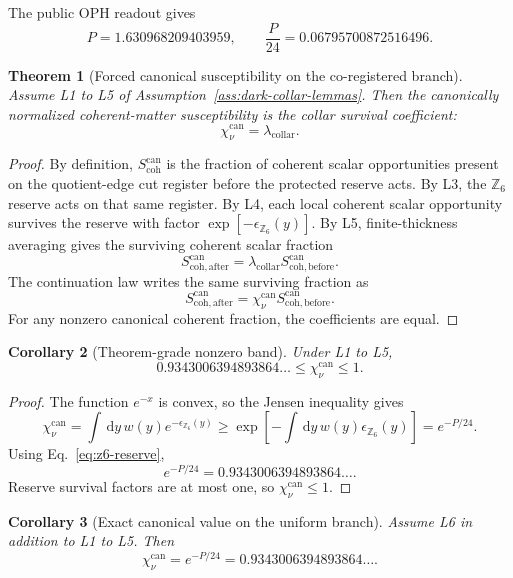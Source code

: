 \documentclass[11pt]{article}
\numberwithin{equation}{section}
\newtheorem{theorem}{Theorem}[section]
\newtheorem{corollary}[theorem]{Corollary}
\theoremstyle{remark}
\newcommand{\chican}{\chi_\nu^{\mathrm{can}}}
\newcommand{\scohcan}{S_{\mathrm{coh}}^{\mathrm{can}}}
\newcommand{\dd}{\,\mathrm d}
\newcommand{\lambdac}{\lambda_{\mathrm{collar}}}
\newcommand{\Zsix}{\mathbb Z_6}
\begin{document}
The public OPH readout gives
\begin{equation}
P=1.630968209403959,
\qquad
\frac{P}{24}=0.06795700872516496.
\label{eq:z6-reserve}
\end{equation}

\begin{theorem}[Forced canonical susceptibility on the co-registered branch]
Assume L1 to L5 of Assumption~\ref{ass:dark-collar-lemmas}. Then the canonically
normalized coherent-matter susceptibility is the collar survival coefficient:
\begin{equation}
\boxed{
\chican=\lambdac.
}
\label{eq:chi-can-lambda}
\end{equation}
\end{theorem}

\begin{proof}
By definition, \(\scohcan\) is the fraction of coherent scalar opportunities
present on the quotient-edge cut register before the protected reserve acts.
By L3, the \(\Zsix\) reserve acts on that same register. By L4, each local
coherent scalar opportunity survives the reserve with factor
\(\exp[-\epsilon_{\Zsix}(y)]\). By L5, finite-thickness averaging gives the
surviving coherent scalar fraction
\[
S_{\mathrm{coh,after}}^{\mathrm{can}}
=
\lambdac S_{\mathrm{coh,before}}^{\mathrm{can}}.
\]
The continuation law writes the same surviving fraction as
\[
S_{\mathrm{coh,after}}^{\mathrm{can}}
=
\chican S_{\mathrm{coh,before}}^{\mathrm{can}}.
\]
For any nonzero canonical coherent fraction, the coefficients are equal.
\end{proof}

\begin{corollary}[Theorem-grade nonzero band]
Under L1 to L5,
\begin{equation}
\boxed{
0.9343006394893864\ldots
\le
\chican
\le
1.
}
\label{eq:chi-can-band}
\end{equation}
\end{corollary}

\begin{proof}
The function \(e^{-x}\) is convex, so the Jensen inequality gives
\[
\chican=\int \dd y\,w(y)e^{-\epsilon_{\Zsix}(y)}
\ge
\exp\!\left[-\int \dd y\,w(y)\epsilon_{\Zsix}(y)\right]
=e^{-P/24}.
\]
Using Eq.~\eqref{eq:z6-reserve},
\[
e^{-P/24}=0.9343006394893864\ldots .
\]
Reserve survival factors are at most one, so \(\chican\le1\).
\end{proof}

\begin{corollary}[Exact canonical value on the uniform branch]
Assume L6 in addition to L1 to L5. Then
\begin{equation}
\boxed{
\chican
=
e^{-P/24}
=
0.9343006394893864\ldots .
}
\label{eq:chi-can-exact}
\end{equation}
\end{corollary}
\end{document}
